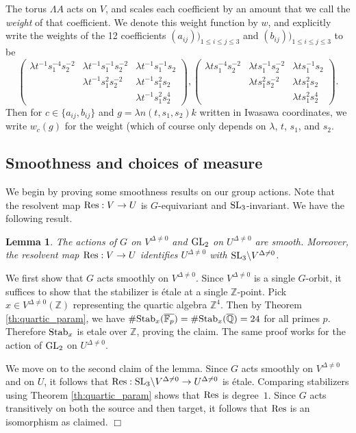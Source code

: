 \documentclass{article}
\def\Z{{\mathbb Z}}
\def\SL{{\rm SL}}
\def\GL{{\rm GL}}
\def\Stab{{\rm Stab}}
\def\Res{{\rm Res}}
\def\F{{\mathbb F}}
\def\Q{{\mathbb Q}}
\def\Z{{\mathbb Z}}
\def\F{{\mathbb F}}
\def\Q{{\mathbb Q}}
\def\ol{\overline}
\newtheorem{lemma}[theorem]{Lemma}
\newenvironment{proof}{\noindent {\bf Proof:}}{$\Box$ \vspace{2 ex}}
\begin{document}
The torus $\Lambda A$ acts on $V$, and scales each coefficient by an amount that we call the {\it weight} of that coefficient. We denote this weight function by $w$, and explicitly write the weights of the 12 coefficients $(a_{ij}))_{1\leq i\leq j\leq 3}$ and $(b_{ij}))_{1\leq i\leq j\leq 3}$ to be
\begin{equation*}
\left(
\begin{array}{ccc}
\lambda t^{-1}s_1^{-4}s_2^{-2} & \lambda  t^{-1}s_1^{-1}s_2^{-2} & \lambda t^{-1}s_1^{-1}s_2\\[.05in]
 & \lambda t^{-1}s_1^{2}s_2^{-2} & \lambda t^{-1}s_1^{2}s_2\\[.05in]
 &  & \lambda t^{-1}s_1^{2}s_2^{4}
\end{array}
\right),
\left(
\begin{array}{ccc}
\lambda ts_1^{-4}s_2^{-2} & \lambda ts_1^{-1}s_2^{-2} & \lambda ts_1^{-1}s_2\\[.05in]
 &\lambda ts_1^{2}s_2^{-2} &\lambda ts_1^{2}s_2\\[.05in]
 &  &\lambda ts_1^{2}s_2^{4}
\end{array}
\right).
\end{equation*}
Then for $c\in\{a_{ij},b_{ij}\}$ and $g=\lambda n(t,s_1,s_2)k$ written in Iwasawa coordinates, we write $w_c(g)$ for the weight (which of course only depends on $\lambda$, $t$, $s_1$, and $s_2$.


\subsection{Smoothness and choices of measure}\label{sec:measures}

We begin by proving some smoothness results on our group actions. Note that the resolvent map $\Res:V\to U$ is $G$-equivariant and $\SL_3$-invariant. We have the following result.
\begin{lemma}\label{lem:smoothness}
The actions of $G$ on $V^{\Delta\neq 0}$ and $\GL_2$ on $U^{\Delta\neq 0}$ are smooth. Moreover, the resolvent map $\Res: V\to U$ identifies $U^{\Delta\neq 0}$ with $\SL_3\backslash V^{\Delta\neq 0}$.
\end{lemma}
\begin{proof}
We first show that $G$ acts smoothly on $V^{\Delta\neq 0}$. Since $V^{\Delta\neq0}$ is a single $G$-orbit, it suffices to show that the stabilizer is \'etale at a single $\Z$-point. Pick $x\in V^{\Delta\neq 0}(\Z)$ representing the quartic algebra $\Z^4$. Then by Theorem \ref{th:quartic_param}, we have $\#\Stab_x(\ol{\F_p})=\#\Stab_x(\ol\Q)=24$ for all primes $p$. Therefore $\Stab_x$ is etale over $\Z$, proving the claim. The same proof works for the action of $\GL_2$ on $U^{\Delta\neq 0}$.

We move on to the second claim of the lemma. Since $G$ acts smoothly on $V^{\Delta\neq 0}$ and on $U$, it follows that $\Res:\SL_3\backslash V^{\Delta\neq 0}\to U^{\Delta\neq 0}$ is \'etale. Comparing stabilizers using Theorem \ref{th:quartic_param} shows that $\Res$ is degree~$1$. Since $G$ acts transitively on both the source and then target, it follows that $\Res$ is an isomorphism as claimed.
\end{proof}
\end{document}
